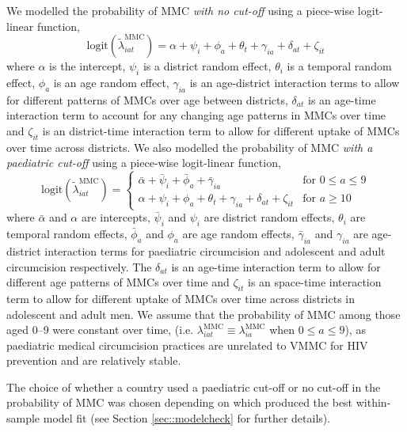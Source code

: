 \documentclass{article}
\begin{document}
\begin{appendix}
We modelled the probability of MMC {\it with no cut-off} using a piece-wise logit-linear function, 
\begin{equation*}
	\text{logit}(\tilde{\lambda}^{\text{MMC}}_{iat}) = \alpha + \psi_i + \phi_a + \theta_t + \gamma_{ia} + \delta_{at} + \zeta_{it} 
\end{equation*}
where $\alpha$ is the intercept, $\psi_i$ is a district random effect, $\theta_i$ is a temporal random effect, $\phi_a$ is an age random effect, $\gamma_{ia}$ is an age-district interaction terms to allow for different patterns of MMCs over age between districts, $\delta_{at}$ is an age-time interaction term to account for any changing age patterns in MMCs over time and $\zeta_{it}$ is an district-time interaction term to allow for different uptake of MMCs over time across districts. We also modelled the probability of MMC {\it with a paediatric cut-off} using a piece-wise logit-linear function, 
\begin{equation*}
	\text{logit}(\tilde{\lambda}^{\text{MMC}}_{iat}) =
	\begin{cases}
		\bar{\alpha} + \bar{\psi}_i + \bar{\phi}_a + \bar{\gamma}_{ia} & \text{for } 0 \leq a \leq 9\\
		\alpha + \psi_i + \phi_a + \theta_t + \gamma_{ia} + \delta_{at} + \zeta_{it} & \text{for } a \geq 10
	\end{cases} 
\end{equation*}
where $\bar{\alpha}$ and $\alpha$ are intercepts, $\bar{\psi}_i$ and $\psi_i$ are district random effects, $\theta_i$ are temporal random effects, $\bar{\phi}_a$ and $\phi_a$ are age random effects, $\bar{\gamma}_{ia}$ and $\gamma_{ia}$ are age-district interaction terms for paediatric circumcision and adolescent and adult circumcision respectively. The $\delta_{at}$ is an age-time interaction term to allow for different age patterns of MMCs over time and $\zeta_{it}$ is an space-time interaction term to allow for different uptake of MMCs over time across districts in adolescent and adult men. We assume that the probability of MMC among those aged 0--9 were constant over time, (i.e. $\lambda^{\text{MMC}}_{iat} \equiv \lambda^{\text{MMC}}_{ia}$ when $0\leq a \leq 9$), as paediatric medical circumcision practices are unrelated to VMMC for HIV prevention and are relatively stable. 

The choice of whether a country used a paediatric cut-off or no cut-off in the probability of MMC was chosen depending on which produced the best within-sample model fit (see Section \ref{sec::modelcheck} for further details). 


\end{appendix}
\end{document}
